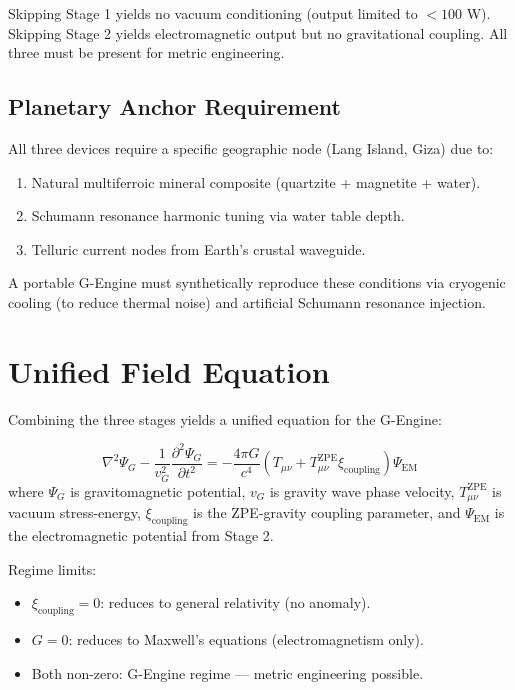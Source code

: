 \documentclass[11pt, twocolumn]{article}
\begin{document}
Skipping Stage 1 yields no vacuum conditioning (output limited to $<100$ W). Skipping Stage 2 yields electromagnetic output but no gravitational coupling. All three must be present for metric engineering.

\subsection{Planetary Anchor Requirement}
All three devices require a specific geographic node (Lang Island, Giza) due to:
\begin{enumerate}
    \item Natural multiferroic mineral composite (quartzite + magnetite + water).
    \item Schumann resonance harmonic tuning via water table depth.
    \item Telluric current nodes from Earth's crustal waveguide.
\end{enumerate}
A portable G-Engine must synthetically reproduce these conditions via cryogenic cooling (to reduce thermal noise) and artificial Schumann resonance injection.

\section{Unified Field Equation}
\label{sec:unified}

Combining the three stages yields a unified equation for the G-Engine:

\begin{equation}
    \nabla^2 \Psi_G - \frac{1}{v_G^2} \frac{\partial^2 \Psi_G}{\partial t^2} = -\frac{4\pi G}{c^4} \left(T_{\mu\nu} + T_{\mu\nu}^{\text{ZPE}} \xi_{\text{coupling}}\right) \Psi_{\text{EM}}
    \label{eq:unified}
\end{equation}
where $\Psi_G$ is gravitomagnetic potential, $v_G$ is gravity wave phase velocity, $T_{\mu\nu}^{\text{ZPE}}$ is vacuum stress-energy, $\xi_{\text{coupling}}$ is the ZPE-gravity coupling parameter, and $\Psi_{\text{EM}}$ is the electromagnetic potential from Stage 2.

Regime limits:
\begin{itemize}
    \item $\xi_{\text{coupling}} = 0$: reduces to general relativity (no anomaly).
    \item $G = 0$: reduces to Maxwell's equations (electromagnetism only).
    \item Both non-zero: G-Engine regime --- metric engineering possible.
\end{itemize}
\end{document}
